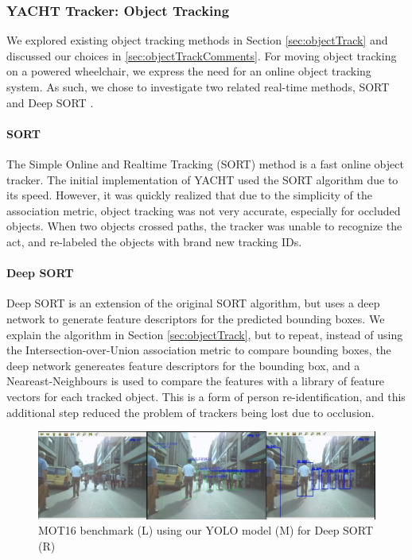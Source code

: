 \subsubsection{YACHT Tracker: Object Tracking}
We explored existing object tracking methods in Section \ref{sec:objectTrack} and discussed our choices in \ref{sec:objectTrackComments}. For moving object tracking on a powered wheelchair, we express the need for an online object tracking system. As such, we chose to investigate two related real-time methods, SORT \cite{Bewley2016} and Deep SORT \cite{Wojke2018}.

\paragraph{SORT}  The Simple Online and Realtime Tracking (SORT) method is a fast online object tracker. The initial implementation of YACHT used the SORT algorithm due to its speed. However, it was quickly realized that due to the simplicity of the association metric, object tracking was not very accurate, especially for occluded objects. When two objects crossed paths, the tracker was unable to recognize the act, and re-labeled the objects with brand new tracking IDs.

\paragraph{Deep SORT} Deep SORT is an extension of the original SORT algorithm, but uses a deep network to generate feature descriptors for the predicted bounding boxes. We explain the algorithm in Section \ref{sec:objectTrack}, but to repeat, instead of using the Intersection-over-Union association metric to compare bounding boxes, the deep network genereates feature descriptors for the bounding box, and a Neareast-Neighbours is used to compare the features with a library of feature vectors for each tracked object. This is a form of person re-identification, and this additional step reduced the problem of trackers being lost due to occlusion.

\begin{figure}[ht]
	\centering
	\includegraphics[width=1.0\linewidth]{img/chapter4_analysis/deepSortMOT.png}
	\caption{MOT16 benchmark \cite{Milan} (L) using our YOLO model (M) for Deep SORT (R)}
	\label{fig:deepSortMOT}
	\vspace{-1\baselineskip}
\end{figure}

